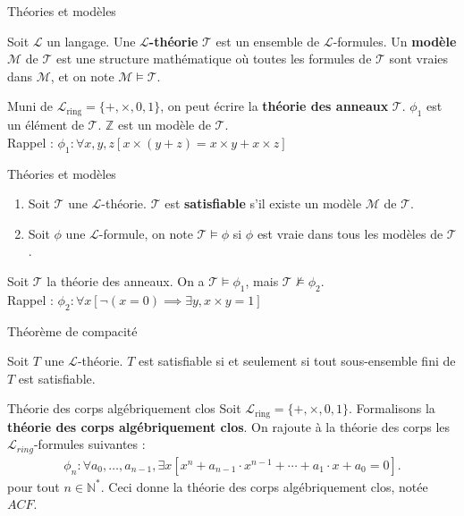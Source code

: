 \documentclass{beamer}
\begin{document}
\begin{frame}{Théories et modèles}
\begin{definition}
Soit $\mathcal{L}$ un langage. Une $\mathcal{L}$\textbf{-théorie} $\mathcal{T}$ est un ensemble de $\mathcal{L}$-formules.
Un \textbf{modèle} $\mathcal{M}$ de $\mathcal{T}$ est une structure mathématique où toutes les formules de $\mathcal{T}$ sont vraies dans $\mathcal{M}$,
et on note $\mathcal{M} \models \mathcal{T}$.
\end{definition}
\pause
\begin{example}
Muni de $\mathcal{L}_{\text{ring}} = \{+, \times, 0, 1\}$, on peut écrire la \textbf{théorie des anneaux} $\mathcal{T}$. $\phi_1$ est un élément de $\mathcal{T}$.
$\mathbb{Z}$ est un modèle de $\mathcal{T}$.\\
Rappel : $\phi_1 : \forall x,y,z [ x \times (y+z) = x \times y + x \times z ]$
\end{example}
\end{frame}

\begin{frame}{Théories et modèles}
\begin{definition}
\begin{enumerate}
\item Soit $\mathcal{T}$ une $\mathcal{L}$-théorie. $\mathcal{T}$ est \textbf{satisfiable} s'il existe un modèle $\mathcal{M}$ de $\mathcal{T}$.
\item Soit $\phi$ une $\mathcal{L}$-formule, on note $\mathcal{T} \models \phi$ si $\phi$ est vraie dans tous les modèles de $\mathcal{T}$.
\end{enumerate}
\end{definition}
\pause
\begin{example}
Soit $\mathcal{T}$ la théorie des anneaux. On a $\mathcal{T} \models \phi_1$, mais $\mathcal{T} \not\models \phi_2$.\\
Rappel : $\phi_2 : \forall x [ \neg(x = 0) \implies \exists y, x \times y = 1 ]$
\end{example}
\end{frame}

\begin{frame}{Théorème de compacité}
\begin{theorem}
Soit $T$ une $\mathcal{L}$-théorie. $T$ est satisfiable si et seulement si tout sous-ensemble fini de $T$ est satisfiable.
\end{theorem}
\end{frame}

\begin{frame}{Théorie des corps algébriquement clos}
Soit $\mathcal{L}_{\text{ring}} = \{+, \times, 0, 1\}$. Formalisons la \textbf{théorie des corps algébriquement clos}.
On rajoute à la théorie des corps les $\mathcal{L}_{ring}$-formules suivantes :
\begin{align*}
 \phi_n : \forall a_0, \ldots, a_{n-1}, \exists x [x^n+a_{n-1}\cdot x^{n-1} + \cdots + a_1 \cdot x + a_0 = 0].
\end{align*}
pour tout $n \in \mathbb{N^*}$. Ceci donne la théorie des corps algébriquement clos, notée $ACF$.
\end{frame}
\end{document}
